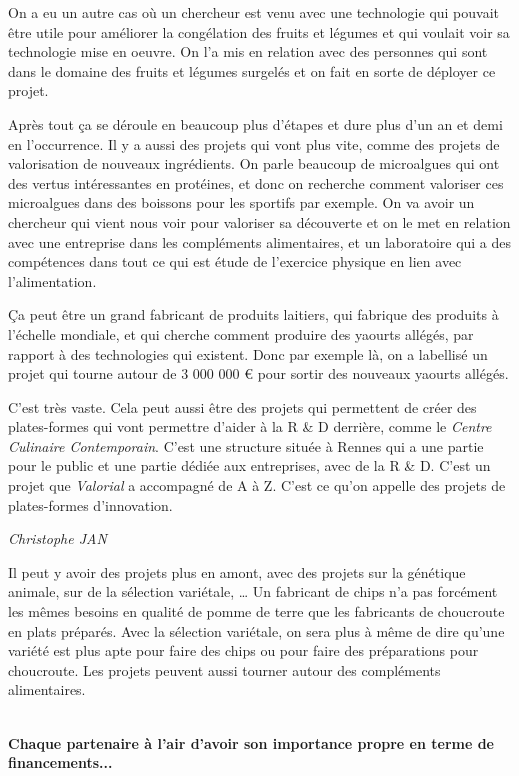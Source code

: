 \documentclass[a4paper,12pt]{report}
\begin{document}
	On a eu un autre cas où un chercheur est venu avec une technologie qui pouvait être utile pour améliorer la congélation des fruits et légumes et qui voulait voir sa technologie mise en oeuvre. On l’a mis en relation avec des personnes qui sont dans le domaine des fruits et légumes surgelés et on fait en sorte de déployer ce projet.

	Après tout ça se déroule en beaucoup plus d’étapes et dure plus d’un an et demi en l’occurrence. Il y a aussi des projets qui vont plus vite, comme des projets de valorisation de nouveaux ingrédients. On parle beaucoup de microalgues qui ont des vertus intéressantes en protéines, et donc on recherche comment valoriser ces microalgues dans des boissons pour les sportifs par exemple. On va avoir un chercheur qui vient nous voir pour valoriser sa découverte et on le met en relation avec une entreprise dans les compléments alimentaires, et un laboratoire qui a des compétences dans tout ce qui est étude de l’exercice physique en lien avec l’alimentation.
	
	Ça peut être un grand fabricant de produits laitiers, qui fabrique des produits à l’échelle mondiale, et qui cherche comment produire des yaourts allégés, par rapport à des technologies qui existent. Donc par exemple là, on a labellisé un projet qui tourne autour de 3 000 000 € pour sortir des nouveaux yaourts allégés.
	
	C’est très vaste. Cela peut aussi être des projets qui permettent de créer des plates-formes qui vont permettre d’aider à la R \& D derrière, comme le \textit{Centre Culinaire Contemporain}. C’est une structure située à Rennes qui a une partie pour le public et une partie dédiée aux entreprises, avec de la R \& D. C’est un projet que \textit{Valorial} a accompagné de A à Z. C’est ce qu’on appelle des projets de plates-formes d’innovation.

	\emph{Christophe JAN}
	
    Il peut y avoir des projets plus en amont, avec des projets sur la génétique animale, sur de la sélection variétale, … Un fabricant de chips n’a pas forcément les mêmes besoins en qualité de pomme de terre que les fabricants de choucroute en plats préparés. Avec la sélection variétale, on sera plus à même de dire qu’une variété est plus apte pour faire des chips ou pour faire des préparations pour choucroute. Les projets peuvent aussi tourner autour des compléments alimentaires.

	\textbf{\\Chaque partenaire à l’air d’avoir son importance propre en terme de financements...}
\end{document}
